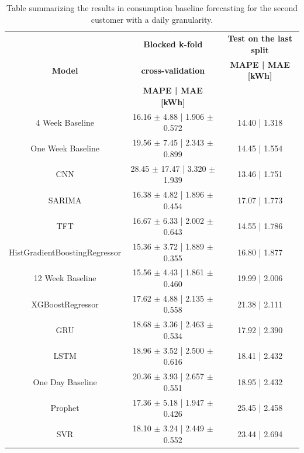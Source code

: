 \begin{table}[H]
\centering
\begin{tabular}{|c|c|c|}
\hline
 & \textbf{Blocked k-fold} & \textbf{Test on the last split}\\
\textbf{Model} & \textbf{cross-validation} & \textbf{MAPE | MAE [kWh]}\\
 & \textbf{MAPE | MAE [kWh]} & \\
\hline
4 Week Baseline & 16.16 $\pm$ 4.88 | 1.906 $\pm$ 0.572 & 14.40 | 1.318\\
\hline
One Week Baseline & 19.56 $\pm$ 7.45 | 2.343 $\pm$ 0.899 & 14.45 | 1.554\\
\hline
CNN & 28.45 $\pm$ 17.47 | 3.320 $\pm$ 1.939 & 13.46 | 1.751\\
\hline
SARIMA & 16.38 $\pm$ 4.82 | 1.896 $\pm$ 0.454 & 17.07 | 1.773\\
\hline
TFT & 16.67 $\pm$ 6.33 | 2.002 $\pm$ 0.643 & 14.55 | 1.786\\
\hline
HistGradientBoostingRegressor & 15.36 $\pm$ 3.72 | 1.889 $\pm$ 0.355 & 16.80 | 1.877\\
\hline
12 Week Baseline & 15.56 $\pm$ 4.43 | 1.861 $\pm$ 0.460 & 19.99 | 2.006\\
\hline
XGBoostRegressor & 17.62 $\pm$ 4.88 | 2.135 $\pm$ 0.558 & 21.38 | 2.111\\
\hline
GRU & 18.68 $\pm$ 3.36 | 2.463 $\pm$ 0.534 & 17.92 | 2.390\\
\hline
LSTM & 18.96 $\pm$ 3.52 | 2.500 $\pm$ 0.616 & 18.41 | 2.432\\
\hline
One Day Baseline & 20.36 $\pm$ 3.93 | 2.657 $\pm$ 0.551 & 18.95 | 2.432\\
\hline
Prophet & 17.36 $\pm$ 5.18 | 1.947 $\pm$ 0.426 & 25.45 | 2.458\\
\hline
SVR & 18.10 $\pm$ 3.24 | 2.449 $\pm$ 0.552 & 23.44 | 2.694\\
\hline
\end{tabular}
\caption{Table summarizing the results in consumption baseline forecasting for the second customer with a daily granularity.}
\label{tab:baselinedailyresults}
\end{table}

